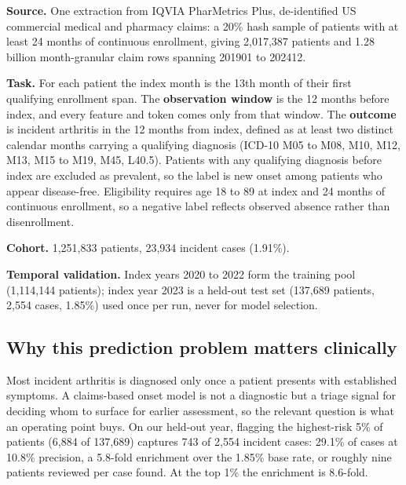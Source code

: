 \documentclass[10pt,twocolumn,letterpaper]{article}
\begin{document}
\textbf{Source.} One extraction from IQVIA PharMetrics Plus, de-identified US commercial medical and pharmacy claims: a 20\% hash sample of patients with at least 24 months of continuous enrollment, giving 2,017,387 patients and 1.28 billion month-granular claim rows spanning 201901 to 202412.



\textbf{Task.} For each patient the index month is the 13th month of their first qualifying enrollment span. The \textbf{observation window} is the 12 months before index, and every feature and token comes only from that window. The \textbf{outcome} is incident arthritis in the 12 months from index, defined as at least two distinct calendar months carrying a qualifying diagnosis (ICD-10 M05 to M08, M10, M12, M13, M15 to M19, M45, L40.5). Patients with any qualifying diagnosis before index are excluded as prevalent, so the label is new onset among patients who appear disease-free. Eligibility requires age 18 to 89 at index and 24 months of continuous enrollment, so a negative label reflects observed absence rather than disenrollment.



\textbf{Cohort.} 1,251,833 patients, 23,934 incident cases (1.91\%).



\textbf{Temporal validation.} Index years 2020 to 2022 form the training pool (1,114,144 patients); index year 2023 is a held-out test set (137,689 patients, 2,554 cases, 1.85\%) used once per run, never for model selection.



\subsection{Why this prediction problem matters clinically}\label{sec:2.1}



Most incident arthritis is diagnosed only once a patient presents with established symptoms. A claims-based onset model is not a diagnostic but a triage signal for deciding whom to surface for earlier assessment, so the relevant question is what an operating point buys. On our held-out year, flagging the highest-risk 5\% of patients (6,884 of 137,689) captures 743 of 2,554 incident cases: 29.1\% of cases at 10.8\% precision, a 5.8-fold enrichment over the 1.85\% base rate, or roughly nine patients reviewed per case found. At the top 1\% the enrichment is 8.6-fold.
\end{document}
